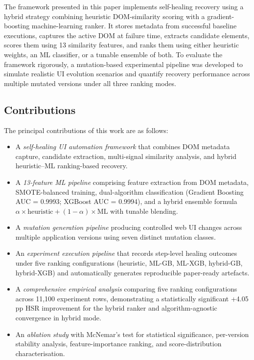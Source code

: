 \documentclass[12pt]{article}
\begin{document}
The framework presented in this paper implements self-healing recovery using a hybrid strategy combining heuristic DOM-similarity scoring with a gradient-boosting machine-learning ranker. It stores metadata from successful baseline executions, captures the active DOM at failure time, extracts candidate elements, scores them using 13 similarity features, and ranks them using either heuristic weights, an ML classifier, or a tunable ensemble of both. To evaluate the framework rigorously, a mutation-based experimental pipeline was developed to simulate realistic UI evolution scenarios and quantify recovery performance across multiple mutated versions under all three ranking modes.

\subsection{Contributions}

The principal contributions of this work are as follows:

\begin{itemize}[leftmargin=1.2em]
    \item A \emph{self-healing UI automation framework} that combines DOM metadata capture, candidate extraction, multi-signal similarity analysis, and hybrid heuristic--ML ranking-based recovery.
    \item A \emph{13-feature ML pipeline} comprising feature extraction from DOM metadata, SMOTE-balanced training, dual-algorithm classification (Gradient Boosting AUC = 0.9993; XGBoost AUC = 0.9994), and a hybrid ensemble formula $\alpha \times \text{heuristic} + (1-\alpha) \times \text{ML}$ with tunable blending.
    \item A \emph{mutation generation pipeline} producing controlled web UI changes across multiple application versions using seven distinct mutation classes.
    \item An \emph{experiment execution pipeline} that records step-level healing outcomes under five ranking configurations (heuristic, ML-GB, ML-XGB, hybrid-GB, hybrid-XGB) and automatically generates reproducible paper-ready artefacts.
    \item A \emph{comprehensive empirical analysis} comparing five ranking configurations across 11,100 experiment rows, demonstrating a statistically significant +4.05 pp HSR improvement for the hybrid ranker and algorithm-agnostic convergence in hybrid mode.
    \item An \emph{ablation study} with McNemar's test for statistical significance, per-version stability analysis, feature-importance ranking, and score-distribution characterisation.
\end{itemize}
\end{document}
